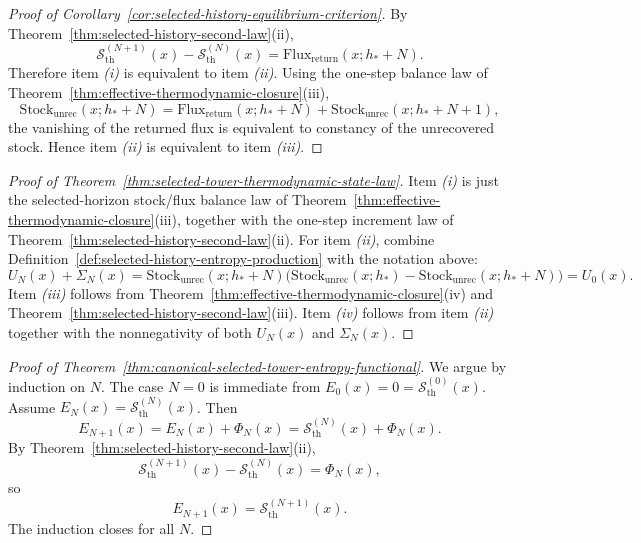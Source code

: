 \begin{proof}[Proof of Corollary~\ref{cor:selected-history-equilibrium-criterion}]
\label{proof:cor:selected-history-equilibrium-criterion}
By Theorem~\ref{thm:selected-history-second-law}(ii),
\[
\mathcal S_{\mathrm{th}}^{(N+1)}(x)-\mathcal S_{\mathrm{th}}^{(N)}(x)
=
\mathrm{Flux}_{\mathrm{return}}(x;h_\ast+N).
\]
Therefore item \emph{(i)} is equivalent to item \emph{(ii)}. Using the
one-step balance law of
Theorem~\ref{thm:effective-thermodynamic-closure}(iii),
\[
\mathrm{Stock}_{\mathrm{unrec}}(x;h_\ast+N)
=
\mathrm{Flux}_{\mathrm{return}}(x;h_\ast+N)
+
\mathrm{Stock}_{\mathrm{unrec}}(x;h_\ast+N+1),
\]
the vanishing of the returned flux is equivalent to constancy of the
unrecovered stock. Hence item \emph{(ii)} is equivalent to item \emph{(iii)}.
\end{proof}

\begin{proof}[Proof of Theorem~\ref{thm:selected-tower-thermodynamic-state-law}]
\label{proof:thm:selected-tower-thermodynamic-state-law}
Item \emph{(i)} is just the selected-horizon stock/flux balance law of
Theorem~\ref{thm:effective-thermodynamic-closure}(iii), together with the
one-step increment law of Theorem~\ref{thm:selected-history-second-law}(ii).
For item \emph{(ii)}, combine Definition~\ref{def:selected-history-entropy-production}
with the notation above:
\[
U_N(x)+\Sigma_N(x)
=
\mathrm{Stock}_{\mathrm{unrec}}(x;h_\ast+N)
\bigl(
\mathrm{Stock}_{\mathrm{unrec}}(x;h_\ast)
-
\mathrm{Stock}_{\mathrm{unrec}}(x;h_\ast+N)
\bigr)
=
U_0(x).
\]
Item \emph{(iii)} follows from
Theorem~\ref{thm:effective-thermodynamic-closure}(iv) and
Theorem~\ref{thm:selected-history-second-law}(iii). Item \emph{(iv)} follows
from item \emph{(ii)} together with the nonnegativity of both \(U_N(x)\) and
\(\Sigma_N(x)\).
\end{proof}

\begin{proof}[Proof of Theorem~\ref{thm:canonical-selected-tower-entropy-functional}]
\label{proof:thm:canonical-selected-tower-entropy-functional}
We argue by induction on \(N\). The case \(N=0\) is immediate from
\(E_0(x)=0=\mathcal S_{\mathrm{th}}^{(0)}(x)\). Assume
\(E_N(x)=\mathcal S_{\mathrm{th}}^{(N)}(x)\). Then
\[
E_{N+1}(x)
=
E_N(x)+\Phi_N(x)
=
\mathcal S_{\mathrm{th}}^{(N)}(x)+\Phi_N(x).
\]
By Theorem~\ref{thm:selected-history-second-law}(ii),
\[
\mathcal S_{\mathrm{th}}^{(N+1)}(x)-\mathcal S_{\mathrm{th}}^{(N)}(x)
=
\Phi_N(x),
\]
so
\[
E_{N+1}(x)
=
\mathcal S_{\mathrm{th}}^{(N+1)}(x).
\]
The induction closes for all \(N\).
\end{proof}

